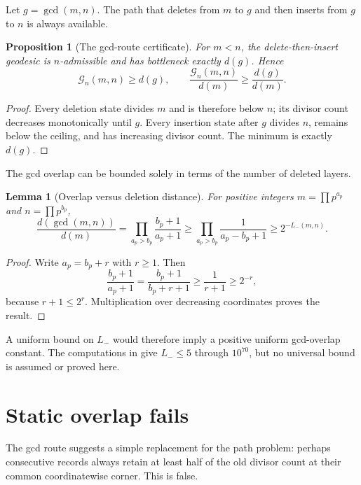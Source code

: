 \documentclass[11pt]{article}
\numberwithin{equation}{section}
\theoremstyle{blueplain}
\newtheorem{proposition}[theorem]{Proposition}
\newtheorem{lemma}[theorem]{Lemma}
\theoremstyle{bluedef}
\newcommand{\Gcal}{\mathcal G}
\begin{document}
Let $g=\gcd(m,n)$.  The path that deletes from $m$ to $g$ and then inserts from $g$ to $n$ is always available.

\begin{proposition}[The gcd-route certificate]
\label{prop:gcd-route}
For $m<n$, the delete-then-insert geodesic is $n$-admissible and has bottleneck exactly $d(g)$.  Hence
\begin{equation}
 \Gcal_n(m,n)\ge d(g),
 \qquad
 \frac{\Gcal_n(m,n)}{d(m)}\ge\frac{d(g)}{d(m)}.
 \label{eq:gcd-route}
\end{equation}
\end{proposition}

\begin{proof}
Every deletion state divides $m$ and is therefore below $n$; its divisor count decreases monotonically until $g$.  Every insertion state after $g$ divides $n$, remains below the ceiling, and has increasing divisor count.  The minimum is exactly $d(g)$.
\end{proof}

The gcd overlap can be bounded solely in terms of the number of deleted layers.

\begin{lemma}[Overlap versus deletion distance]
\label{lem:deletion-overlap}
For positive integers $m=\prod p^{a_p}$ and $n=\prod p^{b_p}$,
\begin{equation}
 \frac{d(\gcd(m,n))}{d(m)}
 =\prod_{a_p>b_p}\frac{b_p+1}{a_p+1}
 \ge \prod_{a_p>b_p}\frac1{a_p-b_p+1}
 \ge 2^{-L_-(m,n)}.
 \label{eq:deletion-overlap}
\end{equation}
\end{lemma}

\begin{proof}
Write $a_p=b_p+r$ with $r\ge1$.  Then
\[
 \frac{b_p+1}{a_p+1}=\frac{b_p+1}{b_p+r+1}
 \ge\frac1{r+1}\ge2^{-r},
\]
because $r+1\le2^r$.  Multiplication over decreasing coordinates proves the result.
\end{proof}

A uniform bound on $L_-$ would therefore imply a positive uniform gcd-overlap constant.  The computations in  give $L_-\le5$ through $10^{70}$, but no universal bound is assumed or proved here.

\section{Static overlap fails}
\label{sec:static-overlap}

The gcd route suggests a simple replacement for the path problem: perhaps consecutive records always retain at least half of the old divisor count at their common coordinatewise corner.  This is false.
\end{document}
